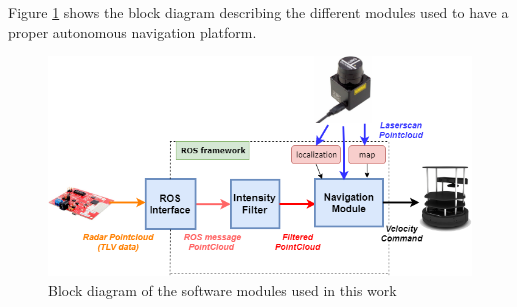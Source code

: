 Figure \ref{fig::softsetup} shows the block diagram describing  the different modules used to have a proper autonomous navigation platform.
\begin{figure}[h] 
\centerline{\includegraphics [width=0.9 \textwidth]{imgs/chapter4/bd.png}}
\caption{Block diagram of the software modules used in this work}
\label{fig::softsetup}
\end{figure}

